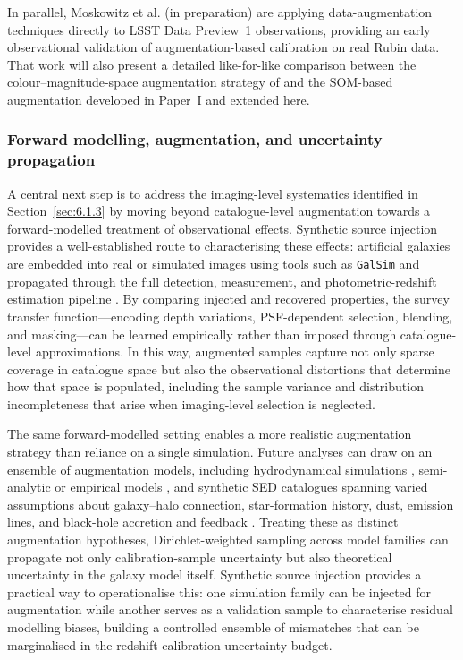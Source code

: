 In parallel, Moskowitz et al. (in preparation) are applying data-augmentation techniques directly to LSST Data Preview~1 observations, providing an early observational validation of augmentation-based calibration on real Rubin data. That work will also present a detailed like-for-like comparison between the colour--magnitude-space augmentation strategy of \citet{2024ApJ...967L...6M} and the SOM-based augmentation developed in Paper~I and extended here.

\subsubsection{Forward modelling, augmentation, and uncertainty propagation} \label{sec:6.2.2}

A central next step is to address the imaging-level systematics identified in Section~\ref{sec:6.1.3} by moving beyond catalogue-level augmentation towards a forward-modelled treatment of observational effects. Synthetic source injection \citep{2016MNRAS.457..786S, 2022ApJS..258...15E, 2025OJAp....8E..65A} provides a well-established route to characterising these effects: artificial galaxies are embedded into real or simulated images using tools such as \texttt{GalSim} \citep{2015A&C....10..121R} and propagated through the full detection, measurement, and photometric-redshift estimation pipeline \citep{2021arXiv210912060V}. By comparing injected and recovered properties, the survey transfer function---encoding depth variations, PSF-dependent selection, blending, and masking---can be learned empirically rather than imposed through catalogue-level approximations. In this way, augmented samples capture not only sparse coverage in catalogue space but also the observational distortions that determine how that space is populated, including the sample variance \citep{2012MNRAS.423..909C} and distribution incompleteness \citep{2022arXiv220708657M} that arise when imaging-level selection is neglected.

The same forward-modelled setting enables a more realistic augmentation strategy than reliance on a single simulation. Future analyses can draw on an ensemble of augmentation models, including hydrodynamical simulations \citep{2015MNRAS.446..521S, 2019ComAC...6....2N, 2025arXiv250821126S, 2025arXiv250904067C}, semi-analytic or empirical models \citep{2012NewA...17..175B, 2015ARA&A..53...51S, 2023A&A...670A.100L}, and synthetic SED catalogues spanning varied assumptions about galaxy--halo connection, star-formation history, dust, emission lines, and black-hole accretion and feedback \citep{2013ARA&A..51..393C, 2024ApJS..274...12A, 2025ApJ...993..240T, 2025A&A...703A.255T, 2025JCAP...06..007F}. Treating these as distinct augmentation hypotheses, Dirichlet-weighted sampling across model families can propagate not only calibration-sample uncertainty but also theoretical uncertainty in the galaxy model itself. Synthetic source injection provides a practical way to operationalise this: one simulation family can be injected for augmentation while another serves as a validation sample to characterise residual modelling biases, building a controlled ensemble of mismatches that can be marginalised in the redshift-calibration uncertainty budget.

